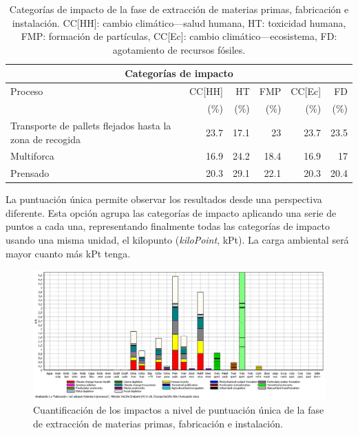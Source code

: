 \begin{table}[!htb]
\centering
\begin{tabular}{p{4cm}rrrrr}
\toprule
\multicolumn{6}{c}{Categorías de impacto}\\
\midrule
Proceso & CC[HH] & HT & FMP & CC[Ec] & FD\\
 &  (\%) & (\%) & (\%) & (\%) & (\%)\\
\midrule
Transporte de pallets flejados hasta la zona de recogida & 23.7 & 17.1 & 23 & 23.7 & 23.5\\
Multiforca & 16.9 & 24.2 & 18.4 & 16.9 & 17\\
Prensado & 20.3 & 29.1 & 22.1 & 20.3 & 20.4\\
\bottomrule
\end{tabular}
\caption[Categorías de impacto de la fase de extracción de materias primas, fabricación e instalación.]{Categorías de impacto de la fase de extracción de materias primas, fabricación e instalación. CC[HH]: cambio climático—salud humana, HT: toxicidad humana, FMP: formación de partículas, CC[Ec]: cambio climático—ecosistema, FD: agotamiento de recursos fósiles.}
\label{categoriasimpactofabricacion}
\end{table}

La puntuación única permite observar los resultados desde una perspectiva diferente. Esta opción agrupa las categorías de impacto aplicando una serie de puntos a cada una, representando finalmente todas las categorías de impacto usando una misma unidad, el kilopunto (\textit{kiloPoint}, kPt). La carga ambiental será mayor cuanto más kPt tenga.

\begin{figure}[!htb]
\centering
\includegraphics[width=15cm]{img/fabric_puntuacionunica.png}
\caption{Cuantificación de los impactos a nivel de puntuación única de la fase de extracción de materias primas, fabricación e instalación.}
\label{fig:fabric_puntuacionunica}
\end{figure}

